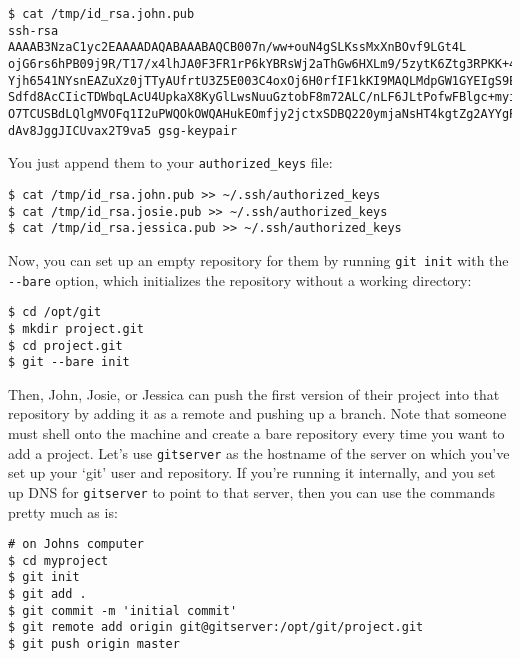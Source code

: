 \documentclass[a4paper]{book}
\begin{document}
\begin{shaded}\begin{verbatim}
$ cat /tmp/id_rsa.john.pub
ssh-rsa AAAAB3NzaC1yc2EAAAADAQABAAABAQCB007n/ww+ouN4gSLKssMxXnBOvf9LGt4L
ojG6rs6hPB09j9R/T17/x4lhJA0F3FR1rP6kYBRsWj2aThGw6HXLm9/5zytK6Ztg3RPKK+4k
Yjh6541NYsnEAZuXz0jTTyAUfrtU3Z5E003C4oxOj6H0rfIF1kKI9MAQLMdpGW1GYEIgS9Ez
Sdfd8AcCIicTDWbqLAcU4UpkaX8KyGlLwsNuuGztobF8m72ALC/nLF6JLtPofwFBlgc+myiv
O7TCUSBdLQlgMVOFq1I2uPWQOkOWQAHukEOmfjy2jctxSDBQ220ymjaNsHT4kgtZg2AYYgPq
dAv8JggJICUvax2T9va5 gsg-keypair
\end{verbatim}\end{shaded}

You just append them to your \texttt{authorized\_keys} file:

\begin{shaded}\begin{verbatim}
$ cat /tmp/id_rsa.john.pub >> ~/.ssh/authorized_keys
$ cat /tmp/id_rsa.josie.pub >> ~/.ssh/authorized_keys
$ cat /tmp/id_rsa.jessica.pub >> ~/.ssh/authorized_keys
\end{verbatim}\end{shaded}

Now, you can set up an empty repository for them by running \texttt{git init} with the \texttt{-{}-bare} option, which initializes the repository without a working directory:

\begin{shaded}\begin{verbatim}
$ cd /opt/git
$ mkdir project.git
$ cd project.git
$ git --bare init
\end{verbatim}\end{shaded}

Then, John, Josie, or Jessica can push the first version of their project into that repository by adding it as a remote and pushing up a branch. Note that someone must shell onto the machine and create a bare repository every time you want to add a project. Let's use \texttt{gitserver} as the hostname of the server on which you've set up your `git' user and repository. If you're running it internally, and you set up DNS for \texttt{gitserver} to point to that server, then you can use the commands pretty much as is:

\begin{shaded}\begin{verbatim}
# on Johns computer
$ cd myproject
$ git init
$ git add .
$ git commit -m 'initial commit'
$ git remote add origin git@gitserver:/opt/git/project.git
$ git push origin master
\end{verbatim}\end{shaded}
\end{document}
